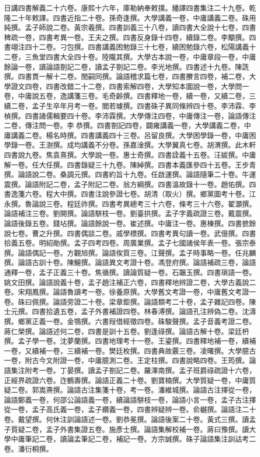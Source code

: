 \begin{pinyinscope}
日講四書解義二十六卷。康熙十六年，庫勒納奉敕撲。繙譯四書集注二十九卷。乾隆二十年敕譯。四書近指二十卷。孫奇逢撰。大學講義一卷，中庸講義二卷。硃用純撰。孟子師說二卷。黃宗羲撰。四書訓義三十八卷，讀四書大全說十七卷，四書稗疏一卷，四書考異一卷。王夫之撰。四書反身錄十四卷，續錄二卷。李顒撰。四書翊注四十二卷。刁包撰。四書講義困勉錄三十七卷，續困勉錄六卷，松陽講義十二卷，三魚堂四書大全四十卷。陸隴其撰。大學古本說一卷，中庸章段一卷，中庸餘論一卷，讀論語劄記二卷，讀孟子劄記二卷。李光地撰。四書述十九卷。陳詵撰。四書貫一解十二卷。閔嗣同撰。論語稽求篇七卷，四書賸言四卷，補二卷，大學證文四卷，四書改錯二十二卷，四書索解四卷，大學知本圖說一卷，大學問一卷，中庸說五卷，逸講箋三卷。毛奇齡撰。四書釋地一卷，續一卷，又續二卷，三續二卷，孟子生卒年月考一卷。閻若璩撰。四書硃子異同條辨四十卷。李沛霖、李楨撰。四書諸儒輯要四十卷。李沛霖撰。大學傳注四卷，中庸傳注一卷，論語傳注二卷，傳注問一卷。李恭撰。四書劄記四卷，闢雍講義一卷，大學講義二卷，中庸講義二卷。楊名時撰。四書講義四十三卷。呂留良撰。大學困學錄一卷，中庸困學錄一卷。王澍撰。成均講義不分卷。孫嘉淦撰。大學翼真七卷。胡渭撰。此木軒四書說九卷。焦袁熹撰。大學說一卷。惠士奇撰。四書詮義十五卷。汪紱撰。中庸解一卷。任大任撰。四書錄疑三十九卷。陳綽撰。四書本義匯參四十五卷。王步青撰。論語說二卷。桑調元撰。四書約旨十九卷。任啟運撰。論語隨筆二十卷。牛運震撰。論語附記二卷，孟子附記二卷。翁方綱撰。四書溫故錄十一卷。趙佑撰。四書逸箋六卷。程大中撰。四書注說參證七卷。胡清（取火）撰。鄉黨圖考十卷。江永撰。魯論說三卷。程廷祚撰。四書考異總考三十六卷，條考三十六卷。翟灝撰。論語補注三卷。劉開撰。論語駢枝一卷。劉臺拱撰。孟子字義疏證三卷。戴震撰。論語後錄五卷。錢坫撰。論語餘說一卷。崔述撰。中庸注一卷。惠棟撰。四書摭餘說七卷。曹之升撰。四書偶談二卷。戚學標撰。四書考異句讀一卷。武億撰。四書拾義五卷。明紹勛撰。孟子四考四卷。周廣業撰。孟子七國諸侯年表一卷。張宗泰撰。論語偶記一卷。方觀旭撰。論語俟質三卷。江聲撰。孟子時事略一卷。任兆麟撰。論語古訓十卷。陳鱣撰。論語異文考證十卷。馮登府撰。論語補疏三卷，論語通釋一卷，孟子正義三十卷。焦循撰。讀論質疑一卷。石韞玉撰。四書瑣語一卷。姚文田撰。論語說義十卷，孟子趙注補正六卷，四書釋地辨證二卷，大學古義說二卷。宋翔鳳撰。論語魯讀考一卷。徐養原撰。大學舊文考證一卷，中庸舊文考證一卷。硃曰佩撰。論語旁證二十卷。梁章鉅撰。論語類考二十卷，孟子雜記四卷。陳士元撰。四書拾遺五卷，孟子外書補證四卷。林春溥撰。論語孔注辨偽二卷。沈濤撰。鄉黨正義一卷。金鶚撰。六書叚借經徵四卷。硃駿聲撰。孟子音義考證二卷。蔣仁榮撰。論語述何二卷，四書是訓十五卷。劉逢祿撰。論語古解十卷。梁廷枬撰。孟子學一卷。沈夢蘭撰。四書地理考十一卷。王鎏撰。四書釋地補一卷，續補一卷，又續補一卷，三續補一卷。樊廷枚撰。四書典故覈三卷。凌曙撰。大學臆古一卷，附古今文附證一卷，中庸臆測二卷。王定柱撰。四書說略四卷。王筠撰。論語集注附考一卷。丁晏撰。讀孟子劄記二卷。羅澤南撰。孟子班爵祿疏證十六卷，正經界疏證六卷。迮鶴壽撰。論語正義二十卷。劉寶楠撰。大學質疑一卷，中庸質疑二卷。郭嵩燾撰。論語古注集箋十卷，考一卷。潘維城撰。論語古注擇從一卷，論語鄭義一卷，何邵公論語義一卷，續論語駢枝一卷，論語小言一卷，孟子古注擇從一卷，孟子高氏義一卷，孟子纘義一卷，四書辨疑辨一卷。俞樾撰。論語注二十卷。戴望撰。何休注訓論語述一卷。劉恭冕撰。論語後案二十卷。黃式三撰。讀孟子質疑二卷，孟子外書集證五卷。施彥士撰。論語集解校補一卷。蔣曰豫撰。讀大學中庸筆記二卷，讀論孟筆記二卷，補記一卷。方宗誠撰。硃子論語集注訓詁考二卷。潘衍桐撰。


\end{pinyinscope}
